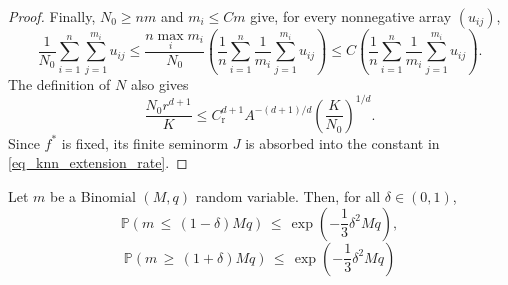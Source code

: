 \documentclass[twoside,11pt]{article}
\newenvironment{revision}{\color{revisionred}}{}
\begin{document}
\begin{revision}
\begin{proof}
Finally, $N_0\geq nm$ and $m_i\leq Cm$ give, for every
nonnegative array $(u_{ij})$,
\[
\frac1{N_0}\sum_{i=1}^n\sum_{j=1}^{m_i}u_{ij}
\leq
\frac{n\max_i m_i}{N_0}
\left(\frac1n\sum_{i=1}^n\frac1{m_i}\sum_{j=1}^{m_i}u_{ij}\right)
\leq
C\left(\frac1n\sum_{i=1}^n\frac1{m_i}\sum_{j=1}^{m_i}u_{ij}\right).
\]
The definition of $N$ also gives
\[
\frac{N_0r^{d+1}}{K}
\leq
C_{\mathrm r}^{d+1}A^{-(d+1)/d}
\left(\frac{K}{N_0}\right)^{1/d}.
\]
Since $f^*$ is fixed, its finite seminorm $J$ is absorbed into
the constant in \eqref{eq_knn_extension_rate}.
\end{proof}
\end{revision}

\begin{lemma}
\label{Lemma_12}
Let \( m \) be a Binomial \( (M, q) \) random variable. Then, for all \( \delta \in (0, 1) \),
\[ \mathbb{P}(m \,\leq\, (1 - \delta)Mq) \,\leq\, \exp\left(-\frac{1}{3}\delta^2 Mq \right), \]
\[ \mathbb{P}(m \,\geq\, (1 + \delta)Mq) \,\leq\, \exp\left(-\frac{1}{3}\delta^2 Mq \right) \]
\end{lemma}
\end{document}
